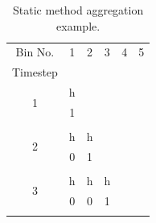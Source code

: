 \documentclass[review,12pt]{elsarticle}
\begin{document}
\begin{table}[htbp!]
\centering
\caption{Static method aggregation example.}
\label{tab:static example}
\begin{tabular}{cccccc}
Bin No.                                  & 1                      & 2                      & 3                      & 4                        & 5                        \\
Timestep                                 &                        &                        &                        &                          &                          \\ \cline{1-2}
\multicolumn{1}{|c|}{\multirow{2}{*}{1}} & \multicolumn{1}{c|}{h} &                        &                        &                          &                          \\ \cline{2-2}
\multicolumn{1}{|c|}{}                   & \multicolumn{1}{c|}{1} &                        &                        &                          &                          \\ \cline{1-2}
                                         &                        &                        &                        &                          &                          \\ \cline{1-3}
\multicolumn{1}{|c|}{\multirow{2}{*}{2}} & \multicolumn{1}{c|}{h} & \multicolumn{1}{c|}{h} &                        &                          &                          \\ \cline{2-3}
\multicolumn{1}{|c|}{}                   & \multicolumn{1}{c|}{0} & \multicolumn{1}{c|}{1} &                        &                          &                          \\ \cline{1-3}
                                         &                        &                        &                        &                          &                          \\ \cline{1-4}
\multicolumn{1}{|c|}{\multirow{2}{*}{3}} & \multicolumn{1}{c|}{h} & \multicolumn{1}{c|}{h} & \multicolumn{1}{c|}{h} &                          &                          \\ \cline{2-4}
\multicolumn{1}{|c|}{}                   & \multicolumn{1}{c|}{0} & \multicolumn{1}{c|}{0} & \multicolumn{1}{c|}{1} &                          &                          \\ \cline{1-4}
                                         &                        &                        &                        &                          &                          \\ \cline{1-5}

\end{tabular}
\end{table}
\end{document}
